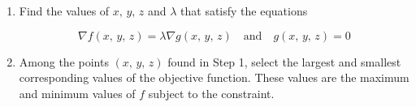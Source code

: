 \begin{enumerate}
    \item Find the values of $x,\, y,\, z$ and $\lambda$ that satisfy the equations

    \begin{equation}
        \nabla f(x,\, y,\, z) = \lambda \nabla g(x,\, y,\, z) \quad \text{and} \quad g(x,\, y,\, z) = 0
    \end{equation}

    \item Among the points $(x,\, y,\, z)$ found in Step 1, select the largest and smallest corresponding values of the objective function. These values are the maximum and minimum values of $f$ subject to the constraint.
\end{enumerate}

